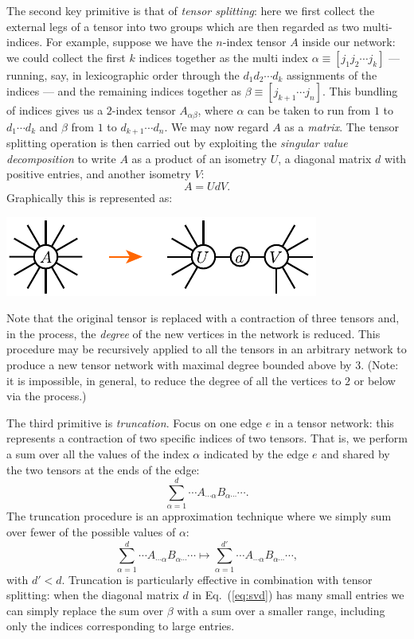 \documentclass[prl,twocolumn,lengthcheck,superscriptaddress]{revtex4-1}
\theoremstyle{definition}
\theoremstyle{remark}
\begin{document}
The second key primitive is that of \emph{tensor splitting}: here we first collect the external legs of a tensor into two groups which are then regarded as two multi-indices. For example, suppose we have the $n$-index tensor $A$ inside our network: we could collect the first $k$ indices together as the multi index  $\alpha \equiv [j_1j_2 \cdots j_k]$ --- running, say, in lexicographic order through the $d_1d_2\cdots d_k$ assignments of the indices  --- and the remaining indices together as $\beta \equiv [j_{k+1}\cdots j_n]$. This bundling of indices gives us a $2$-index tensor $A_{\alpha\beta}$, where $\alpha$ can be taken to run from $1$ to $d_1\cdots d_k$ and $\beta$ from $1$ to $d_{k+1}\cdots d_n$. We may now regard $A$ as a \emph{matrix}. The tensor splitting operation is then carried out by exploiting the \emph{singular value decomposition} \cite{horn:1990a} to write $A$ as a product of an isometry $U$, a diagonal matrix $d$ with positive entries, and another isometry $V$: 
\begin{equation}\label{eq:svd}
	A = UdV.
\end{equation}
Graphically this is represented as:
\begin{center}
\includegraphics{tensorsplitting.pdf}
\end{center}
Note that the original tensor is replaced with a contraction of three tensors and, in the process, the \emph{degree} of the new vertices in the network is reduced. This procedure may be recursively applied to all the tensors in an arbitrary network to produce a new tensor network with maximal degree bounded above by $3$. (Note: it is impossible, in general, to reduce the degree of all the vertices to $2$ or below via the process.)

The third primitive is \emph{truncation}. Focus on one edge $e$ in a tensor network: this represents a contraction of two specific indices of two tensors. That is, we perform a sum over all the values of the index $\alpha$ indicated by the edge $e$ and shared by the two tensors at the ends of the edge:
\begin{equation}
	\sum_{\alpha = 1}^{d} \cdots A_{\cdots \alpha} B_{\alpha \cdots} \cdots.
\end{equation}
The truncation procedure is an approximation technique where we simply sum over fewer of the possible values of $\alpha$:
\begin{equation}
	\sum_{\alpha = 1}^{d} \cdots A_{\cdots \alpha} B_{\alpha \cdots} \cdots \mapsto \sum_{\alpha = 1}^{d'} \cdots A_{\cdots \alpha} B_{\alpha \cdots} \cdots,
\end{equation}
with $d' < d$. Truncation is particularly effective in combination with tensor splitting: when the diagonal matrix $d$ in Eq.~(\ref{eq:svd}) has many small entries we can simply replace the sum over $\beta$ with a sum over a smaller range, including only the indices corresponding to large entries.
\end{document}
